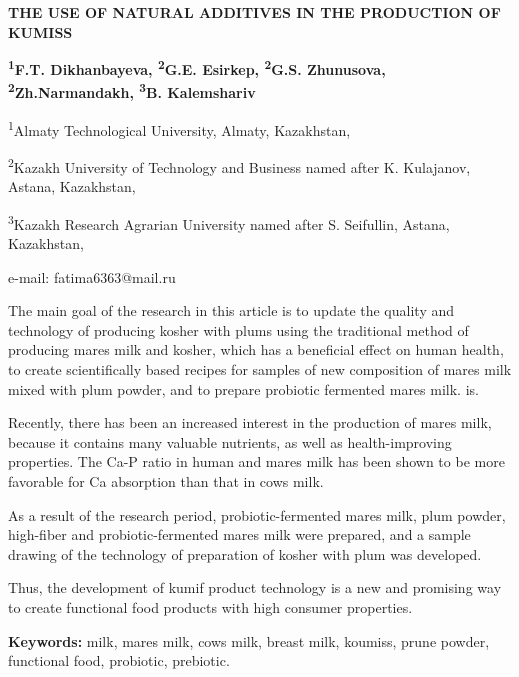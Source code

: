 \begin{center}
{\large\bfseries THE USE OF NATURAL ADDITIVES IN THE PRODUCTION OF KUMISS}

{\bfseries \textsuperscript{1}F.T. Dikhanbayeva, \textsuperscript{2}G.E. Esirkep, \textsuperscript{2}G.S. Zhunusova, \textsuperscript{2}Zh.Narmandakh, \textsuperscript{3}B. Kalemshariv}

\textsuperscript{1}Almaty Technological University, Almaty, Kazakhstan,

\textsuperscript{2}Kazakh University of Technology and Business named
after K. Kulajanov, Astana, Kazakhstan,

\textsuperscript{3}Kazakh Research Agrarian University named after S.
Seifullin, Astana, Kazakhstan,

e-mail: fatima6363@mail.ru
\end{center}

The main goal of the research in this article is to update the quality
and technology of producing kosher with plums using the traditional
method of producing mare\textquotesingle s milk and kosher, which has a
beneficial effect on human health, to create scientifically based
recipes for samples of new composition of mare\textquotesingle s milk
mixed with plum powder, and to prepare probiotic fermented
mare\textquotesingle s milk. is.

Recently, there has been an increased interest in the production of
mare\textquotesingle s milk, because it contains many valuable
nutrients, as well as health-improving properties. The Ca-P ratio in
human and mare\textquotesingle s milk has been shown to be more
favorable for Ca absorption than that in cow\textquotesingle s milk.

As a result of the research period, probiotic-fermented
mare\textquotesingle s milk, plum powder, high-fiber and
probiotic-fermented mare\textquotesingle s milk were prepared, and a
sample drawing of the technology of preparation of kosher with plum was
developed.

Thus, the development of kumif product technology is a new and promising
way to create functional food products with high consumer properties.

{\bfseries Keywords:} milk, mare\textquotesingle s milk,
cow\textquotesingle s milk, breast milk, koumiss, prune powder,
functional food, probiotic, prebiotic.


